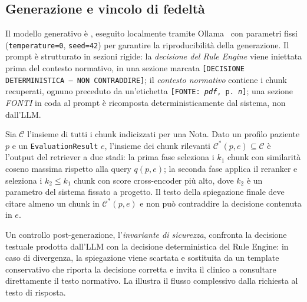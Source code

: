 \subsection{Generazione e vincolo di fedeltà}
\label{subsec:generazione}

Il modello generativo è \llmmodel, eseguito localmente tramite
Ollama~\cite{ollama2024} con parametri fissi (\texttt{temperature=0},
\texttt{seed=42}) per garantire la riproducibilità della generazione.
Il prompt è strutturato in sezioni rigide: la \emph{decisione del Rule Engine}
viene iniettata prima del contesto normativo, in una sezione marcata
\texttt{[DECISIONE DETERMINISTICA --- NON CONTRADDIRE]};
il \emph{contesto normativo} contiene i chunk recuperati, ognuno preceduto
da un'etichetta \texttt{[FONTE: \textit{pdf}, p.\,\textit{n}]};
una sezione \emph{FONTI} in coda al prompt è ricomposta deterministicamente
dal sistema, non dall'LLM.

\begin{definition}
\label{def:chunk-rilevanti}
Sia $\mathcal{C}$ l'insieme di tutti i chunk indicizzati per una Nota.
Dato un profilo paziente $p$ e un \texttt{EvaluationResult} $e$,
l'insieme dei chunk rilevanti $\mathcal{C}^*(p, e) \subseteq \mathcal{C}$
è l'output del retriever a due stadi: la prima fase seleziona i $k_1$
chunk con similarità coseno massima rispetto alla query $q(p, e)$;
la seconda fase applica il reranker \reranker{} e seleziona i $k_2 \leq k_1$
chunk con score cross-encoder più alto, dove $k_2$ è un parametro
del sistema fissato a progetto.
Il testo della spiegazione finale deve citare almeno un chunk in
$\mathcal{C}^*(p, e)$ e non può contraddire la decisione contenuta in $e$.
\end{definition}

Un controllo post-generazione, l'\emph{invariante di sicurezza},
confronta la decisione testuale prodotta dall'LLM con la decisione
deterministica del Rule Engine: in caso di divergenza, la spiegazione
viene scartata e sostituita da un template conservativo che riporta
la decisione corretta e invita il clinico a consultare direttamente
il testo normativo.
La  illustra il flusso complessivo dalla richiesta
al testo di risposta.

